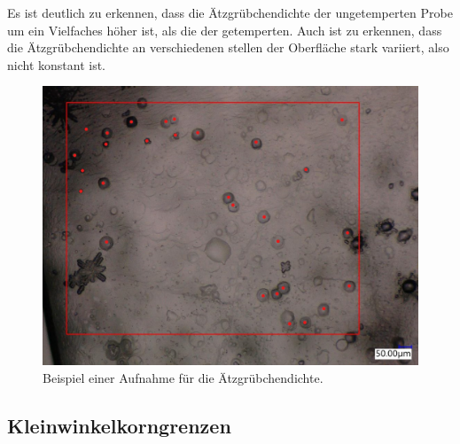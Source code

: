         Es ist deutlich zu erkennen, dass die Ätzgrübchendichte der ungetemperten Probe um ein Vielfaches höher ist, als die der getemperten.
        Auch ist zu erkennen, dass die Ätzgrübchendichte an verschiedenen stellen der Oberfläche stark variiert, also nicht konstant ist.
    \begin{figure}[H]
        \centering
        \includegraphics[width=\textwidth]{Images/Beispiel_ätzgrübchendichte.PNG}
        \caption{Beispiel einer Aufnahme für die Ätzgrübchendichte.}
    \end{figure}

    \subsection{Kleinwinkelkorngrenzen}
